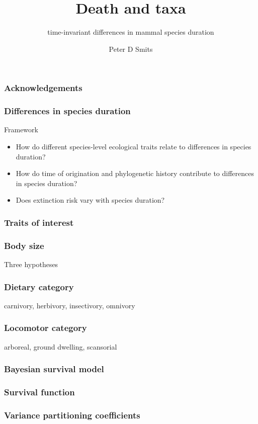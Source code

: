 \documentclass{beamer}
\title{Death and taxa}
\subtitle{time-invariant differences in mammal species duration}
\author{Peter D Smits}
\institute{Committee on Evolutionary Biology}
\date{}
\begin{document}
\begin{frame}
  \titlepage
\end{frame}

\begin{frame}
  \frametitle{Acknowledgements}
\end{frame}

\begin{frame}
  \frametitle{Differences in species duration}

  \begin{block}{Framework}
    \begin{itemize}
      \item How do different species-level ecological traits relate to differences in species duration?
      \item How do time of origination and phylogenetic history contribute to differences in species duration?
      \item Does extinction risk vary with species duration?
    \end{itemize}
  \end{block}
\end{frame}

\begin{frame}
  \frametitle{Traits of interest}
\end{frame}

\begin{frame}
  \frametitle{Body size}

  Three hypotheses
\end{frame}

\begin{frame}
  \frametitle{Dietary category}

  carnivory, herbivory, insectivory, omnivory
\end{frame}

\begin{frame}
  \frametitle{Locomotor category}

  arboreal, ground dwelling, scansorial
\end{frame}

\begin{frame}
  \frametitle{Bayesian survival model}
\end{frame}

\begin{frame}
  \frametitle{Survival function}
\end{frame}

\begin{frame}
  \frametitle{Variance partitioning coefficients}
\end{frame}
\end{document}
